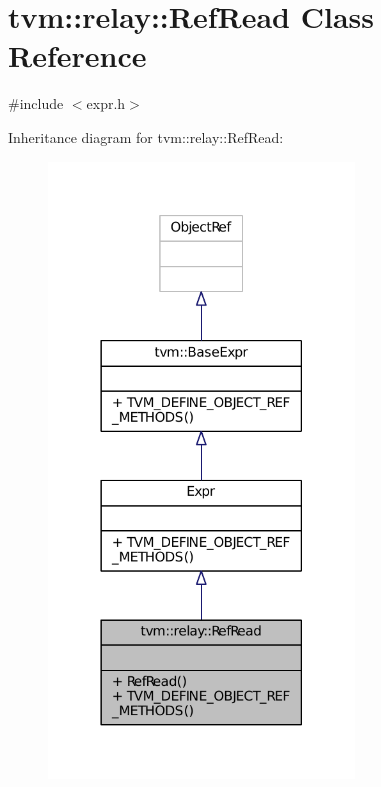 \hypertarget{classtvm_1_1relay_1_1RefRead}{}\section{tvm\+:\+:relay\+:\+:Ref\+Read Class Reference}
\label{classtvm_1_1relay_1_1RefRead}


{\ttfamily \#include $<$expr.\+h$>$}



Inheritance diagram for tvm\+:\+:relay\+:\+:Ref\+Read\+:
\nopagebreak
\begin{figure}[H]
\begin{center}
\leavevmode
\includegraphics[width=230pt]{classtvm_1_1relay_1_1RefRead__inherit__graph}
\end{center}
\end{figure}


